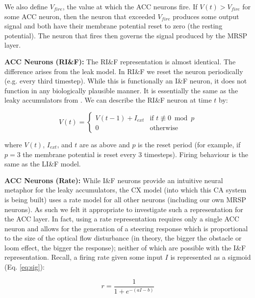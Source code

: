 \documentclass[a4paper,11pt,twoside,openright]{article}
\begin{document}
We also define $V_{fire}$, the value at which the ACC neurons fire.
If $V(t) > V_{fire}$ for some ACC neuron, then the neuron that exceeded
$V_{fire}$ produces some output signal and both have their membrane potential
reset to zero (the resting potential). The neuron that fires then governs the
signal produced by the MRSP layer.
\newline\par

\textbf{ACC Neurons (RI\&F):}
The RI\&F representation is almost identical. The difference arises from the leak
model. In RI\&F we reset the neuron periodically (e.g. every third timestep).
While this is functionally an I\&F neuron, it does not function in any
biologically plausible manner. It is essentially the same as the leaky
accumulators from \cite{Mitchell2018}. We can describe the RI\&F neuron at time
$t$ by:

\begin{equation}
  V(t) =
  \begin{cases}
    V(t-1) + I_{ext} & \text{if } t \not\equiv 0 \bmod p \\
    0 & \text{otherwise}
  \end{cases}
\end{equation}

where $V(t)$, $I_{ext}$, and $t$ are as above and $p$ is the reset period (for
example, if $p = 3$ the membrane potential is reset every 3 timesteps). Firing
behaviour is the same as the LI\&F model.
\newline\par

\textbf{ACC Neurons (Rate):}
While I\&F neurons provide an intuitive neural metaphor for the leaky
accumulators, the CX model (into which this CA system is being built) uses
a rate model for all other neurons (including our own MRSP neurons). As such we
felt it appropriate to investigate such a representation for the ACC layer. In
fact, using a rate representation requires only a single ACC neuron and allows
for the generation of a steering response which is proportional to the size of
the optical flow disturbance (in theory, the bigger the obstacle or loom effect,
the bigger the response); neither of which are possible with the I\&F
representation. Recall, a firing rate given some input $I$ is represented as a
sigmoid (Eq. \ref{eq:sig}):

\begin{equation*}
r = \frac{1}{1 + e^{-(aI - b)}}
\end{equation*}
\end{document}
